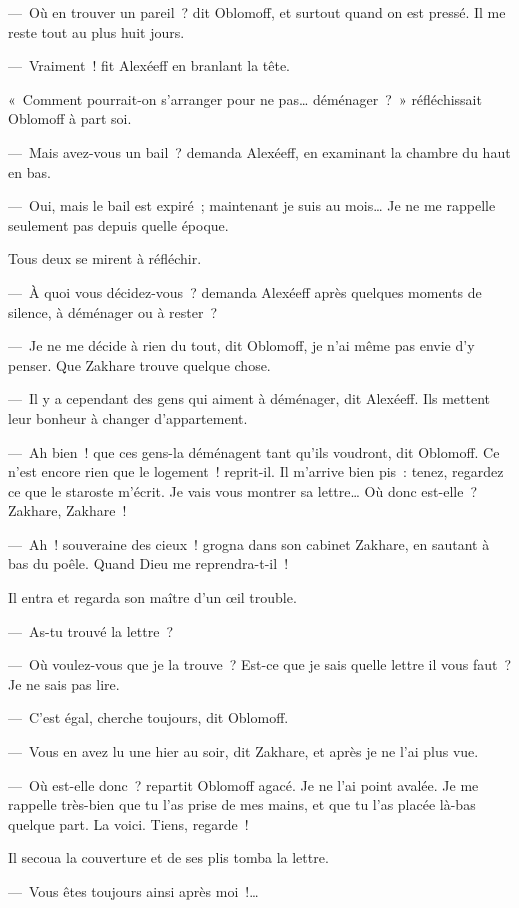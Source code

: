 \documentclass[french,twoside]{book} %
\begin{document}
— Où en trouver un pareil ? dit Oblomoff, et surtout quand on est pressé. Il me reste tout au plus huit jours.\par
— Vraiment ! fit Alexéeff en branlant la tête.\par
« Comment pourrait-on s’arranger pour ne pas… déménager ? » réfléchissait Oblomoff à part soi.\par
— Mais avez-vous un bail ? demanda Alexéeff, en examinant la chambre du haut en bas.\par
— Oui, mais le bail est expiré ; maintenant je suis au mois… Je ne me rappelle seulement pas depuis quelle époque.\par
Tous deux se mirent à réfléchir.\par
— À quoi vous décidez-vous ? demanda Alexéeff après quelques moments de silence, à déménager ou à rester ?\par
— Je ne me décide à rien du tout, dit Oblomoff, je n’ai même pas envie d’y penser. Que Zakhare trouve quelque chose.\par
— Il y a cependant des gens qui aiment à déménager, dit Alexéeff. Ils mettent leur bonheur à changer d’appartement.\par
— Ah bien ! que ces gens-la déménagent tant qu’ils voudront, dit Oblomoff. Ce n’est encore rien que le logement ! reprit-il. Il m’arrive bien pis : tenez, regardez ce que le staroste m’écrit. Je vais vous montrer sa lettre… Où donc est-elle ? Zakhare, Zakhare !\par
— Ah ! souveraine des cieux ! grogna dans son cabinet Zakhare, en sautant à bas du poêle. Quand Dieu me reprendra-t-il !\par
Il entra et regarda son maître d’un œil trouble.\par
— As-tu trouvé la lettre ?\par
— Où voulez-vous que je la trouve ? Est-ce que je sais quelle lettre il vous faut ? Je ne sais pas lire.\par
— C’est égal, cherche toujours, dit Oblomoff.\par
— Vous en avez lu une hier au soir, dit Zakhare, et après je ne l’ai plus vue.\par
— Où est-elle donc ? repartit Oblomoff agacé. Je ne l’ai point avalée. Je me rappelle très-bien que tu l’as prise de mes mains, et que tu l’as placée là-bas quelque part. La voici. Tiens, regarde !\par
Il secoua la couverture et de ses plis tomba la lettre.\par
— Vous êtes toujours ainsi après moi !…\par
\end{document}
